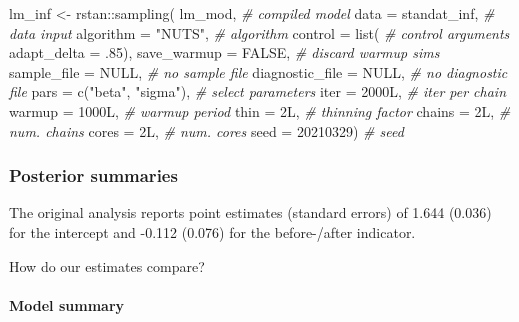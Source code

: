 \documentclass[
  11pt,
]{article}
\newenvironment{Shaded}{\begin{snugshade}}{\end{snugshade}}
\newcommand{\AttributeTok}[1]{\textcolor[rgb]{0.77,0.63,0.00}{#1}}
\newcommand{\CommentTok}[1]{\textcolor[rgb]{0.56,0.35,0.01}{\textit{#1}}}
\newcommand{\ConstantTok}[1]{\textcolor[rgb]{0.00,0.00,0.00}{#1}}
\newcommand{\DecValTok}[1]{\textcolor[rgb]{0.00,0.00,0.81}{#1}}
\newcommand{\FunctionTok}[1]{\textcolor[rgb]{0.00,0.00,0.00}{#1}}
\newcommand{\NormalTok}[1]{#1}
\newcommand{\OtherTok}[1]{\textcolor[rgb]{0.56,0.35,0.01}{#1}}
\newcommand{\SpecialCharTok}[1]{\textcolor[rgb]{0.00,0.00,0.00}{#1}}
\newcommand{\StringTok}[1]{\textcolor[rgb]{0.31,0.60,0.02}{#1}}
\begin{document}
\begin{Shaded}
\begin{Highlighting}[]
\NormalTok{lm\_inf }\OtherTok{\textless{}{-}}\NormalTok{ rstan}\SpecialCharTok{::}\FunctionTok{sampling}\NormalTok{(}
\NormalTok{  lm\_mod,                     }\CommentTok{\# compiled model}
  \AttributeTok{data =}\NormalTok{ standat\_inf,             }\CommentTok{\# data input}
  \AttributeTok{algorithm =} \StringTok{"NUTS"}\NormalTok{,         }\CommentTok{\# algorithm}
  \AttributeTok{control =} \FunctionTok{list}\NormalTok{(             }\CommentTok{\# control arguments}
    \AttributeTok{adapt\_delta =}\NormalTok{ .}\DecValTok{85}\NormalTok{),}
  \AttributeTok{save\_warmup =} \ConstantTok{FALSE}\NormalTok{,        }\CommentTok{\# discard warmup sims}
  \AttributeTok{sample\_file =} \ConstantTok{NULL}\NormalTok{,         }\CommentTok{\# no sample file}
  \AttributeTok{diagnostic\_file =} \ConstantTok{NULL}\NormalTok{,     }\CommentTok{\# no diagnostic file}
  \AttributeTok{pars =} \FunctionTok{c}\NormalTok{(}\StringTok{"beta"}\NormalTok{, }\StringTok{"sigma"}\NormalTok{),  }\CommentTok{\# select parameters}
  \AttributeTok{iter =}\NormalTok{ 2000L,               }\CommentTok{\# iter per chain}
  \AttributeTok{warmup =}\NormalTok{ 1000L,             }\CommentTok{\# warmup period}
  \AttributeTok{thin =}\NormalTok{ 2L,                  }\CommentTok{\# thinning factor}
  \AttributeTok{chains =}\NormalTok{ 2L,                }\CommentTok{\# num. chains}
  \AttributeTok{cores =}\NormalTok{ 2L,                 }\CommentTok{\# num. cores}
  \AttributeTok{seed =} \DecValTok{20210329}\NormalTok{)            }\CommentTok{\# seed}
\end{Highlighting}
\end{Shaded}

\hypertarget{posterior-summaries}{%
\subsubsection{Posterior summaries}\label{posterior-summaries}}

The original analysis reports point estimates (standard errors) of 1.644 (0.036) for the intercept and -0.112 (0.076) for the before-/after indicator.

How do our estimates compare?

\hypertarget{model-summary}{%
\paragraph{Model summary}\label{model-summary}}
\end{document}
